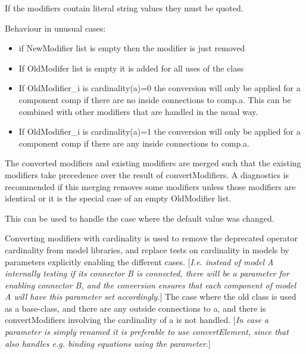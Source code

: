 If the modifiers contain literal string values they must be quoted.

Behaviour in unusual cases:

\begin{itemize}
\item
  if NewModifier list is empty then the modifier is just removed
\item
  If OldModifer list is empty it is added for all uses of the class
\item
  If OldModifier\_i is cardinality(a)=0 the conversion will only be
  applied for a component comp if there are no inside connections to
  comp.a. This can be combined with other modifiers that are handled in
  the usual way.
\item
  If OldModifier\_i is cardinality(a)=1 the conversion will only be
  applied for a component comp if there are any inside connections to
  comp.a.
\end{itemize}

The converted modifiers and existing modifiers are merged such that the existing modifiers take precedence over the result of convertModifiers.
A diagnostics is recommended if this merging removes some modifiers unless those modifiers are identical or it is the special case of an empty OldModifier list.
\begin{nonnormative}
This can be used to handle the case where the default value was changed.
\end{nonnormative}

Converting modifiers with cardinality is used to remove the deprecated
operator cardinality from model libraries, and replace tests on
cardinality in models by parameters explicitly enabling the different
cases. {[}\emph{I.e. instead of model A internally testing if its
connector B is connected, there will be a parameter for enabling
connector B, and the conversion ensures that each component of model A
will have this parameter set accordingly.}{]} The case where the old
class is used as a base-class, and there are any outside connections to
a, and there is convertModifiers involving the cardinality of a is not
handled. {[}\emph{In case a parameter is simply renamed it is preferable
to use convertElement, since that also handles e.g. binding equations
using the parameter.}{]}

